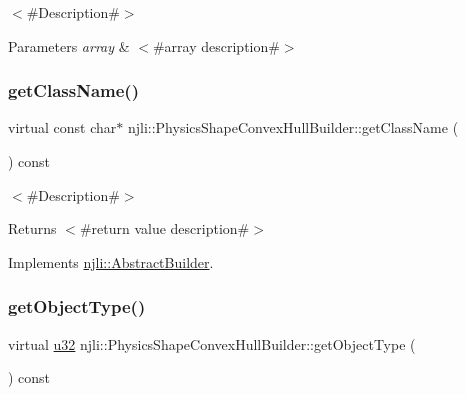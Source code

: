 $<$\#\+Description\#$>$


\begin{DoxyParams}{Parameters}
{\em array} & $<$\#array description\#$>$ \\
\hline
\end{DoxyParams}
\mbox{\label{classnjli_1_1_physics_shape_convex_hull_builder_af7f60ae74a27d8338281678cd150160f}} 
\subsubsection{\texorpdfstring{get\+Class\+Name()}{getClassName()}}
{\footnotesize\ttfamily virtual const char$\ast$ njli\+::\+Physics\+Shape\+Convex\+Hull\+Builder\+::get\+Class\+Name (\begin{DoxyParamCaption}{ }\end{DoxyParamCaption}) const\hspace{0.3cm}{\ttfamily [virtual]}}

$<$\#\+Description\#$>$

\begin{DoxyReturn}{Returns}
$<$\#return value description\#$>$ 
\end{DoxyReturn}


Implements \mbox{\hyperlink{classnjli_1_1_abstract_builder_a902f73ea78031b06aca183a417f3413b}{njli\+::\+Abstract\+Builder}}.

\mbox{\label{classnjli_1_1_physics_shape_convex_hull_builder_a76d05fadd8ccea50dd90a6528e5002c9}} 
\subsubsection{\texorpdfstring{get\+Object\+Type()}{getObjectType()}}
{\footnotesize\ttfamily virtual \mbox{\hyperlink{_util_8h_a10e94b422ef0c20dcdec20d31a1f5049}{u32}} njli\+::\+Physics\+Shape\+Convex\+Hull\+Builder\+::get\+Object\+Type (\begin{DoxyParamCaption}{ }\end{DoxyParamCaption}) const\hspace{0.3cm}{\ttfamily [virtual]}}

